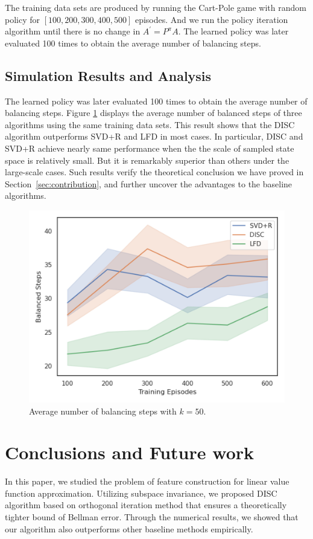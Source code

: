 \documentclass[onecolumn, conference]{IEEEtran}
\begin{document}
The training data sets are produced by running the Cart-Pole game with random policy for $[100, 200, 300, 400, 500]$ episodes. And we run the policy iteration algorithm until there is no change in $A^{\prime}=P^{\pi}A$. The learned policy was later evaluated 100 times to obtain the average number of balancing steps. 
\subsection{Simulation Results and Analysis}
The learned policy was later evaluated 100 times to obtain the average number of balancing steps. Figure \ref{fig: BS} displays the average number of balanced steps of three algorithms using the same training data sets. This result shows that the DISC algorithm outperforms SVD+R and LFD in most cases. In particular, DISC and SVD+R achieve nearly same performance when the the scale of sampled state space is relatively small. But it is remarkably superior than others under the large-scale cases. Such results verify the theoretical conclusion we have proved in Section~\ref{sec:contribution}, and further uncover the advantages to the baseline algorithms.

\begin{figure}[htb]
    \centering
    \includegraphics[scale=0.4]{BS.png}
    \caption{Average number of balancing steps with $k = 50$.}
    \label{fig: BS}
\end{figure}

\section{Conclusions and Future work}\label{sec:conclusion}
In this paper, we studied the problem of feature construction for linear value function approximation. Utilizing subspace invariance, we proposed DISC algorithm based on orthogonal iteration method that ensures a theoretically tighter bound of Bellman error. Through the numerical results, we showed that our algorithm also outperforms other baseline methods empirically.
\end{document}
